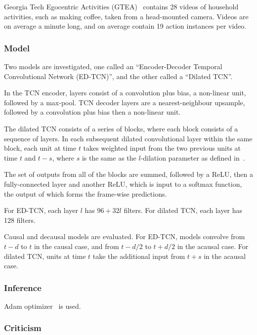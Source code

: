 \documentclass[a4paper, 12pt]{article}
\begin{document}
Georgia Tech Egocentric Activities (GTEA)~\citet{Fathi:2011:LRO:2191740.2191834}
contains 28 videos of household activities, such as making coffee, taken from a
head-mounted camera.  Videos are on average a minute long, and on average
contain 19 action instances per video.

\subsubsection{Model}

Two models are investigated, one called an ``Encoder-Decoder Temporal
Convolutional Network (ED-TCN)'', and the other called a ``Dilated TCN''.

In the TCN encoder, layers consist of a convolution plus bias, a non-linear
unit, followed by a max-pool. TCN decoder layers are a nearest-neighbour
upsample, followed by a convolution plus bias then a non-linear unit.

The dilated TCN consists of a series of blocks, where each block consists of a
sequence of layers. In each subsequent dilated convolutional layer within the
same block, each unit at time $t$ takes weighted input from the two previous
units at time $t$ and $t - s$, where $s$ is the same as the $l$-dilation
parameter as defined in~\citet{DBLP:journals/corr/YuK15}.

The set of outputs from all of the blocks are summed, followed by a ReLU, then
a fully-connected layer and another ReLU\@, which is input to a softmax
function, the output of which forms the frame-wise predictions.

For ED-TCN, each layer $l$ has $96 + 32l$ filters. For dilated TCN, each layer
has 128 filters.

Causal and decausal models are evaluated. For ED-TCN, models convolve from $t -
d$ to $t$ in the causal case, and from $t - d/2$ to $t + d/2$ in the acausal
case. For dilated TCN, units at time $t$ take the additional input from $t + s$
in the acausal case.

\subsubsection{Inference}

Adam optimizer~\citet{DBLP:journals/corr/KingmaB14} is used.

\subsubsection{Criticism}
\end{document}
